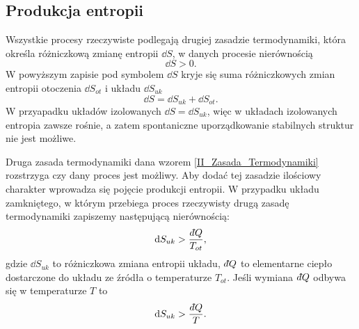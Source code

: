 \documentclass[10pt, a4paper, twoside, onecolumn]{article}
\numberwithin{equation}{section}
\newcommand{\dbar}{d\hspace*{-0.08em}\bar{}\hspace*{0.1em}}
\begin{document}
	\subsection{Produkcja entropii}
	Wszystkie procesy rzeczywiste podlegają drugiej zasadzie termodynamiki, która określa różniczkową zmianę entropii \(\dd{S}\), w danych procesie nierównością
	\begin{equation}\label{II_Zasada_Termodynamiki}
		\dd{S}>0.
	\end{equation}
	W powyższym zapisie pod symbolem \(\dd{S}\) kryje się suma różniczkowych zmian entropii otoczenia \(\dd{S_{ot}}\) i układu \(\dd{S_{uk}}\)
	\begin{equation}
		\dd{S}=\dd{S_{uk}}+\dd{S_{ot}}.
	\end{equation}
	W przyapadku układów izolowanych \(\dd{S}=\dd{S_{uk}}\), 
	więc w układach izolowanych entropia zawsze rośnie, a zatem spontaniczne uporządkowanie stabilnych struktur nie jest możliwe. \par
	Druga zasada termodynamiki dana wzorem \eqref{II_Zasada_Termodynamiki} rozstrzyga czy dany proces jest możliwy. Aby dodać tej zasadzie ilościowy charakter wprowadza się pojęcie produkcji entropii. W przypadku układu zamkniętego, w którym przebiega proces rzeczywisty drugą zasadę termodynamiki zapiszemy następującą nierównością: 
	\begin{equation}\label{II_Zasada_Termodynamiki_uklad}
		\dd{S_{uk}}>\frac{\dbar Q}{T_{ot}},
	\end{equation}
	gdzie \(\dd{S_{uk}}\) to różniczkowa zmiana entropii układu, \(\dbar Q\) to elementarne ciepło dostarczone do układu ze źródła o temperaturze \(T_{ot}\). Jeśli wymiana \(\dbar Q\) odbywa się w temperaturze \(T\) to 
	\begin{equation}
		\dd{S_{uk}}>\frac{\dbar Q}{T}.
	\end{equation}
	
	
\end{document}
